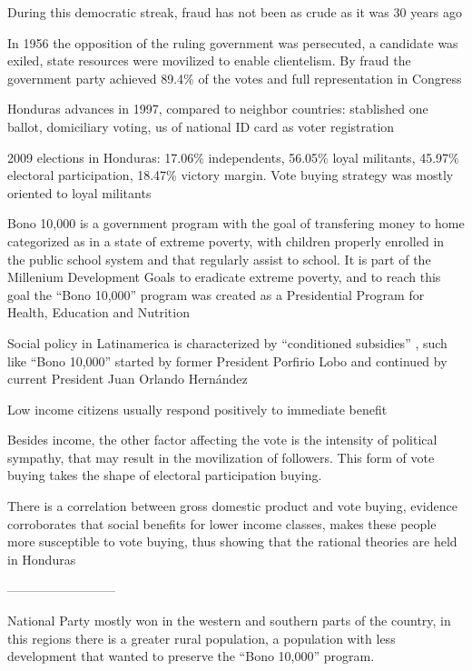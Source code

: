\documentclass[a4paper,10pt]{article}
\begin{document}
During this democratic streak, fraud has not been as crude as it was 30 years ago \citep{romero2014}

In 1956 the opposition of the ruling government was persecuted, a candidate was exiled, state resources were movilized to enable clientelism. By fraud the government party achieved 89.4\% of the votes and full representation in Congress \citep{romero2014}

Honduras advances in 1997, compared to neighbor countries: stablished one ballot, domiciliary voting, us of national ID card as voter registration \citep{romero2014}

2009 elections in Honduras: 17.06\% independents, 56.05\% loyal militants, 45.97\% electoral participation, 18.47\% victory margin. Vote buying strategy was mostly oriented to loyal militants \citep{gonza2014}


Bono 10,000 is a government program with the goal of transfering money to home categorized as in a state of extreme poverty, with children properly enrolled in the public school system and that regularly assist to school. It is part of the Millenium Development Goals \citep{mdg2006} to eradicate extreme poverty, and to reach this goal the ``Bono 10,000'' program was created as a Presidential Program for Health, Education and Nutrition \citep{bono10k}

Social policy in Latinamerica is characterized by ``conditioned subsidies'' \citep{romero2014}, such like ``Bono 10,000'' started by former President Porfirio Lobo and continued by current President Juan Orlando Hern\'{a}ndez

Low income citizens usually respond positively to immediate benefit \citep{kit2000}

Besides income, the other factor affecting the vote is the intensity of political sympathy, that may result in the movilization of followers. This form of vote buying takes the shape of electoral participation buying.

There is a correlation between gross domestic product and vote buying, evidence corroborates that social benefits for lower income classes, makes these people more susceptible to vote buying, thus showing that the rational theories are held in Honduras \citep{gonza2014}

--------------------------

National Party mostly won in the western and southern parts of the country, in this regions there is a greater rural population, a population with less development that wanted to preserve the ``Bono 10,000'' program.
\end{document}
